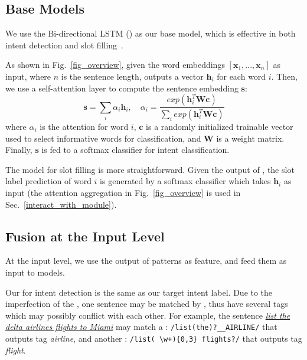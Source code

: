 \subsection{Base Models}
We use the Bi-directional LSTM (\BLSTM) as our base \NN model, which is effective in both intent detection and slot
filling~\cite{liu2016attention}.

As shown in Fig.~\ref{fig_overview}, given the word embeddings $[\textbf{x}_1, ..., \textbf{x}_n]$ as input, where $n$ is the sentence length, \BLSTM outputs a vector $\textbf{h}_i$ for each word $i$.
Then, we use a self-attention layer to compute the sentence embedding $\textbf{s}$:
\begin{equation}
\textbf{s} = \sum_{i}{\alpha_i\textbf{h}_i}, \quad \alpha_i=\frac{exp(\textbf{h}_i^T\textbf{Wc})}{\sum_{i}{exp(\textbf{h}_i^T\textbf{Wc})}}
\label{eq:simple_att}
\end{equation}
where  $\alpha_i$ is the attention for word $i$, $\textbf{c}$ is a randomly initialized trainable vector used to select informative words for classification, and $\textbf{W}$ is a weight matrix.
Finally, $\textbf{s}$ is fed to a softmax classifier for intent classification.

The model for slot filling is more straightforward. Given the output of \BLSTM, the slot label prediction of word $i$ is generated by a
softmax classifier which takes $\textbf{h}_i$ as input (the attention aggregation in Fig.~\ref{fig_overview} is used in Sec.~\ref{interact_with_module}).


\subsection{Fusion at the Input Level}
\label{fusion_with_input}
At the input level, we use the output of \RE patterns as feature, and feed them as input to \NN models.

Our \REtag for intent detection is the same as our target intent label.
Due to the imperfection of the \REs, one sentence may be matched by \REs, thus have several \RE tags which may possibly conflict with each other. For example, the
sentence \textsl{\underline{list the delta airlines flights to Miami}} may match a \RE: {\small \texttt{/list(\;the)?\;\_\_AIRLINE/}} that outputs
tag \emph{airline}, and another \RE: {\small \texttt{/list(\,\textbackslash w+)\{0,3\} flights?/}} that outputs tag \emph{flight}.

